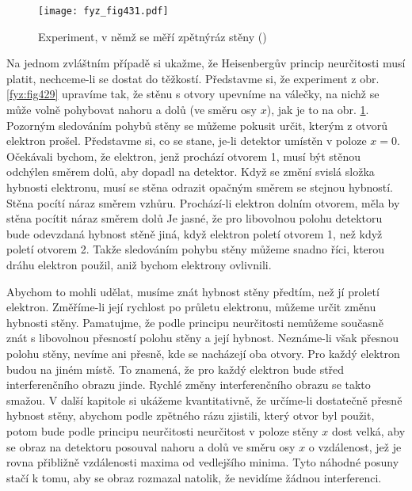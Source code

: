     \begin{figure}[ht!] %
      \centering
      \texttt{[image: fyz\_fig431.pdf]}
      \caption{Experiment, v němž se měří zpětnýráz stěny (\cite[s.~697]{Feynman01})}
      \label{fyz:fig431}
    \end{figure}

    Na jednom zvláštním případě si ukažme, že Heisenbergův princip neurčitosti musí platit,
    nechceme-li se dostat do těžkostí. Představme si, že experiment z obr. \ref{fyz:fig429} upravíme
    tak, že stěnu s otvory upevníme na válečky, na nichž se může volně pohybovat nahoru a dolů (ve
    směru osy \(x\)), jak je to na obr. \ref{fyz:fig431}. Pozorným sledováním pohybů stěny se můžeme
    pokusit určit, kterým z otvorů elektron prošel. Představme si, co se stane, je-li detektor
    umístěn v poloze \(x= 0\). Očekávali bychom, že elektron, jenž prochází otvorem 1, musí být
    stěnou odchýlen směrem dolů, aby dopadl na detektor. Když se změní svislá složka hybnosti
    elektronu, musí se stěna odrazit opačným směrem se stejnou hybností. Stěna pocítí náraz směrem
    vzhůru. Prochází-li elektron dolním otvorem, měla by stěna pocítit náraz směrem dolů Je jasné,
    že pro libovolnou polohu detektoru bude odevzdaná hybnost stěně jiná, když elektron poletí
    otvorem 1, než když poletí otvorem 2. Takže sledováním pohybu stěny můžeme snadno říci, kterou
    dráhu elektron použil, aniž bychom elektrony ovlivnili.

    Abychom to mohli udělat, musíme znát hybnost stěny předtím, než jí proletí elektron. Změříme-li
    její rychlost po průletu elektronu, můžeme určit změnu hybnosti stěny. Pamatujme, že podle
    principu neurčitosti nemůžeme současně znát s libovolnou přesností polohu stěny a její hybnost.
    Neznáme-li však přesnou polohu stěny, nevíme ani přesně, kde se nacházejí oba otvory. Pro každý
    elektron budou na jiném místě. To znamená, že pro každý elektron bude střed interferenčního
    obrazu jinde. Rychlé změny interferenčního obrazu se takto smažou. V další kapitole si ukážeme
    kvantitativně, že určíme-li dostatečně přesně hybnost stěny, abychom podle zpětného rázu
    zjistili, který otvor byl použit, potom bude podle principu neurčitosti neurčitost v poloze
    stěny \(x\) dost velká, aby se obraz na detektoru posouval nahoru a dolů ve směru osy \(x\) o
    vzdálenost, jež je rovna přibližně vzdálenosti maxima od vedlejšího minima. Tyto náhodné posuny
    stačí k tomu, aby se obraz rozmazal natolik, že nevidíme žádnou interferenci.
    
